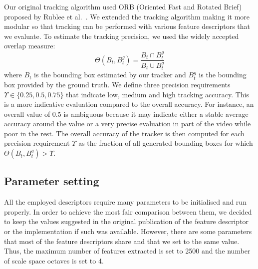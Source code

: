 Our original tracking algorithm used ORB (Oriented Fast and Rotated Brief) proposed by Rublee et al.~\cite{rublee11}. 
We extended the tracking algorithm making it more modular so that tracking can be performed with 
various feature descriptors that we evaluate. To estimate the tracking precision, we used the widely accepted overlap measure:
\begin{equation}
	\Theta (B_{t}, B^g_t) = \frac{B_{t} \cap B^g_t}{B_{t} \cup B^g_t}
\end{equation}
where \textit{$B_{t}$} is the bounding box estimated by our tracker and
\textit{$B^g_t$} is the bounding box provided by the ground truth. We define 
three precision requirements $\Upsilon \in \{0.25, 0.5, 0.75\}$ that indicate low, medium and high tracking accuracy. This is a more indicative evaluation compared to the overall accuracy. For instance, an overall value of 0.5 is ambiguous because it may indicate either a stable average accuracy around the value or a very precise evaluation in part of the video while poor in the rest.
%
%
%
%
%
The overall accuracy of the tracker is then computed for each precision requirement $\Upsilon$ as the fraction of all generated bounding boxes for which $\Theta(B_{t}, B^g_t) > \Upsilon$.



\subsection{Parameter setting}

All the employed descriptors require many parameters to be initialised and run properly. In order to achieve the most fair comparison between them, we decided to keep the values suggested in the original publication of the feature descriptor or the implementation if such was available. However, there are some parameters that most of the feature descriptors share and that we set to the same value. Thus, the maximum number of features extracted is set to 2500 and the number of scale space octaves is set to 4.



